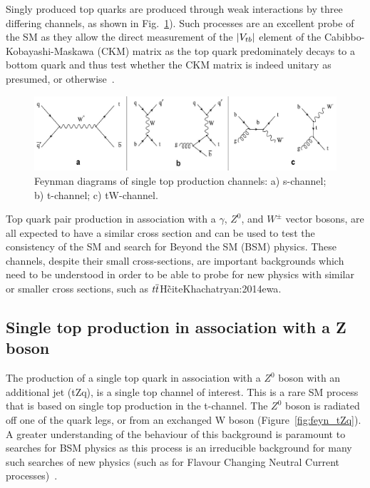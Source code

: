 Singly produced top quarks are produced through weak interactions by three differing channels, as shown in Fig.~\ref{fig:feyn_singletop}).
Such processes are an excellent probe of the SM as they allow the direct measurement of the $\lvert V_{tb} \rvert$ element of the Cabibbo-Kobayashi-Maskawa (CKM) matrix as the top quark predominately decays to a bottom quark and thus test whether the CKM matrix is indeed unitary as presumed, or otherwise~\cite{Shibata:2008sy}.

\begin{figure}[htbp]
\begin{center}
\includegraphics[width=1.00\textwidth]{figs/top-physics/singletop_feyn.jpg}
\caption{Feynman diagrams of single top production channels: a) s-channel; b) t-channel; c) tW-channel.}
\label{fig:feyn_singletop}
\end{center}
\end{figure}




Top quark pair production in association with a $\gamma$, $Z^{0}$, and $W^{\pm}$ vector bosons, are all expected to have a similar cross section and can be used to test the consistency of the SM and search for Beyond the SM (BSM) physics.
These channels, despite their small cross-sections, are important backgrounds which need to be understood in order to be able to probe for new physics with similar or smaller cross sections, such as $t\overline{t}$H\~cite{Khachatryan:2014ewa}.

\subsection{Single top production in association with a Z boson}\label{subsec:tZqTheory}

The production of a single top quark in association with a $Z^{0}$ boson with an additional jet (tZq), is a single top channel of interest.
This is a rare SM process that is based on single top production in the t-channel. The $Z^{0}$ boson is radiated off one of the quark legs, or from an exchanged W boson (Figure~\ref{fig:feyn_tZq}).
A greater understanding of the behaviour of this background is paramount to searches for BSM physics as this process is an irreducible background for many such searches of new physics (such as for Flavour Changing Neutral Current processes)~\cite{Quadt}. 

